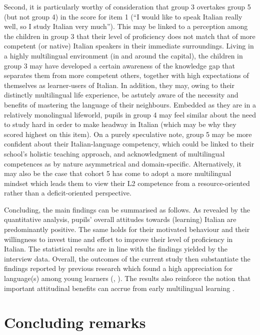 \documentclass[output=paper]{../langscibook}
\begin{document}
Second, it is particularly worthy of consideration that group 3 overtakes group 5 (but not group 4) in the score for item 1 (``I would like to speak Italian really well, so I study Italian very much''). This may be linked to a perception among the children in group 3 that their level of proficiency does not match that of more competent (or native) Italian speakers in their immediate surroundings. Living in a highly multilingual environment (in and around the capital), the children in group 3 may have developed a certain awareness of the knowledge gap that separates them from more competent others, together with high expectations of themselves as learner-users of Italian. In addition, they may, owing to their distinctly multilingual life experience, be astutely aware of the necessity and benefits of mastering the language of their neighbours. Embedded as they are in a relatively monolingual lifeworld, pupils in group 4 may feel similar about the need to study hard in order to make headway in Italian (which may be why they scored highest on this item). On a purely speculative note, group 5 may be more confident about their Italian-language competency, which could be linked to their school’s holistic teaching approach, and acknowledgment of multilingual competences as by nature asymmetrical and domain-specific. Alternatively, it may also be the case that cohort 5 has come to adopt a more multilingual mindset which leads them to view their L2 competence from a resource-oriented rather than a deficit-oriented perspective.

Concluding, the main findings can be summarised as follows. As revealed by the quantitative analysis, pupils’ overall attitudes towards (learning) Italian are predominantly positive. The same holds for their motivated behaviour and their willingness to invest time and effort to improve their level of proficiency in Italian. The statistical results are in line with the findings yielded by the interview data. Overall, the outcomes of the current study then substantiate the findings reported by previous research which found a high appreciation for language(s) among young learners (\citealt{Nikolov1999}, \citealt{Shameem2004}). The results also reinforce the notion that important attitudinal benefits can accrue from early multilingual learning \citep{Helot2008}.

\section{Concluding remarks}
\end{document}

